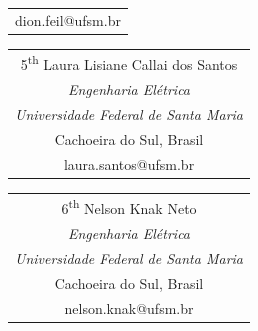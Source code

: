 \documentclass[conference]{IEEEtran}
\begin{document}
{{\begin{tabular}[t]{@{}c@{}}
{\normalsize dion.feil@ufsm.br}
\end{tabular}%
\hfill
\begin{tabular}[t]{@{}c@{}}
{\large5\textsuperscript{th} Laura Lisiane Callai dos Santos}\\
{\normalsize\textit{Engenharia Elétrica}}\\
{\normalsize\textit{Universidade Federal de Santa Maria}}\\
{\normalsize Cachoeira do Sul, Brasil}\\
{\normalsize laura.santos@ufsm.br}
\end{tabular}%
\hfill
\begin{tabular}[t]{@{}c@{}}
{\large6\textsuperscript{th} Nelson Knak Neto}\\
{\normalsize\textit{Engenharia Elétrica}}\\
{\normalsize\textit{Universidade Federal de Santa Maria}}\\
{\normalsize Cachoeira do Sul, Brasil}\\
{\normalsize nelson.knak@ufsm.br}
\end{tabular}%
\hfill}%
}

\maketitle
\end{document}
